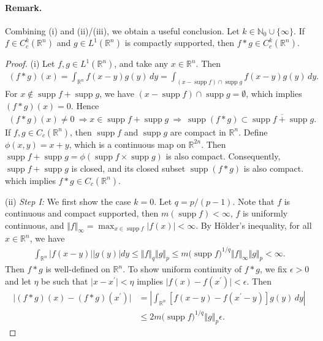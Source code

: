 \documentclass{article}
\numberwithin{equation}{section}
\newcommand{\bbR}{\mathbb{R}}
\DeclareMathOperator{\supp}{supp}
\theoremstyle{plain}
\theoremstyle{definition}
\begin{document}
\paragraph{Remark.} Combining (i) and (ii)/(iii), we obtain a useful conclusion. Let $k\in\mathbb{N}_0\cup\{\infty\}$. If $f\in C_c^k(\mathbb{R}^n)$ and $g\in L^1(\mathbb{R}^n)$ is compactly supported, then $f*g\in C_c^k(\mathbb{R}^n)$.
\begin{proof}
	(i) Let $f,g\in L^1(\mathbb{R}^n)$, and take any $x\in\mathbb{R}^n$. Then
	\begin{align*}
		(f*g)(x) = \int_{\bbR^n} f(x-y)g(y)\,dy = \int_{(x-\supp f)\cap \supp g}f(x-y)g(y)\,dy.
	\end{align*}
	For $x\notin \supp f + \supp g$, we have $(x-\supp f)\cap \supp g=\emptyset$, which implies $(f*g)(x) = 0$. Hence
	\begin{align*}
		(f*g)(x)\neq 0\ \Rightarrow x\in \supp f + \supp g\ \Rightarrow\ \supp(f*g)\subset\overline{\supp f + \supp g}.
	\end{align*}
	If $f,g\in C_c(\mathbb{R}^n)$, then $\supp f$ and $\supp g$ are compact in $\mathbb{R}^n$. Define $\phi(x,y)=x+y$, which is a continuous map on $\mathbb{R}^{2n}$. Then $\supp f + \supp g = \phi(\supp f\times\supp g)$ is also compact. Consequently, $\supp f + \supp g$ is closed, and its closed subset $\supp (f*g)$ is also compact. which implies $f*g\in C_c(\mathbb{R}^n)$.
	\vspace{0.1cm}
	
	(ii) \textit{Step I:} We first show the case $k=0$. Let $q=p/(p-1)$. Note that $f$ is continuous and compact supported, then $m(\supp f) < \infty$, $f$ is uniformly continuous, and $\Vert f\Vert_\infty = \max_{x\in\supp f}\vert f(x)\vert < \infty$. By Hölder's inequality, for all $x\in\mathbb{R}^n$, we have
	\begin{align*}
		\int_{\bbR^n}\left\vert f(x-y)\right\vert\left\vert g(y)\right\vert dy \leq \Vert f\Vert_q\Vert g\Vert_p \leq m\bigl(\supp f\bigr)^{1/q}\Vert f\Vert_\infty\Vert g\Vert_p < \infty.
	\end{align*}
	Then $f*g$ is well-defined on $\mathbb{R}^n$. To show uniform continuity of $f*g$, we fix $\epsilon>0$ and let $\eta$ be such that $\vert x-x^\prime\vert<\eta$ implies $\vert f(x)-f(x^\prime)\vert < \epsilon$. Then
	\begin{align*}
		\vert(f*g)(x) - (f*g)(x^\prime)\vert &= \left\vert\int_{\bbR^n} \left[f(x-y) - f(x^\prime-y)\right]g(y)\,dy\right\vert\\
		&\leq 2m\bigl(\supp f\bigr)^{1/q}\left\Vert g\right\Vert_p\epsilon.
	\end{align*}
	

\end{proof}
\end{document}
